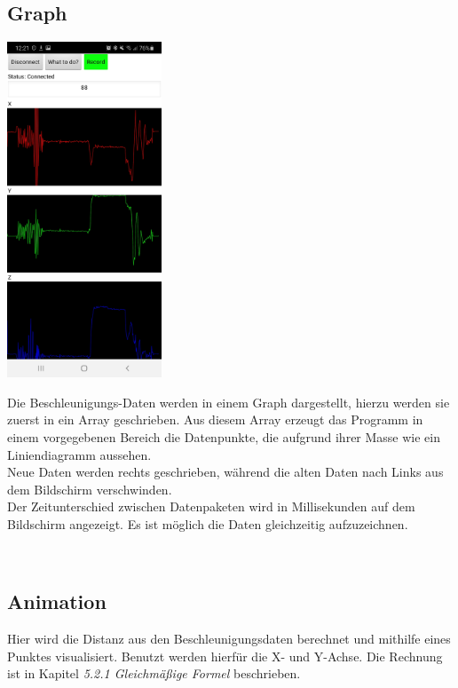 \subsection{Graph}
   \begin{minipage}{0.5\textwidth}
        \includegraphics[height=10cm]{Bilder/Graph.jpg}
    \end{minipage}
    \hfill
    \begin{minipage}{0.5\textwidth}
        Die Beschleunigungs-Daten werden in einem Graph dargestellt, hierzu werden sie zuerst in ein
        Array geschrieben. Aus diesem Array erzeugt das Programm in einem vorgegebenen Bereich
        die Datenpunkte, die aufgrund ihrer Masse wie ein Liniendiagramm aussehen.\\
        Neue Daten werden rechts geschrieben, während die alten Daten nach Links aus dem
        Bildschirm verschwinden.\\
        Der Zeitunterschied zwischen Datenpaketen wird in Millisekunden auf dem Bildschirm
        angezeigt.
        Es ist möglich die Daten gleichzeitig aufzuzeichnen.\\
    \end{minipage}
\\

\subsection{Animation}
Hier wird die Distanz aus den Beschleunigungsdaten berechnet und mithilfe eines Punktes
visualisiert. Benutzt werden hierfür die X- und Y-Achse. 
Die Rechnung ist in Kapitel \textit{5.2.1 Gleichmäßige Formel}  beschrieben.

